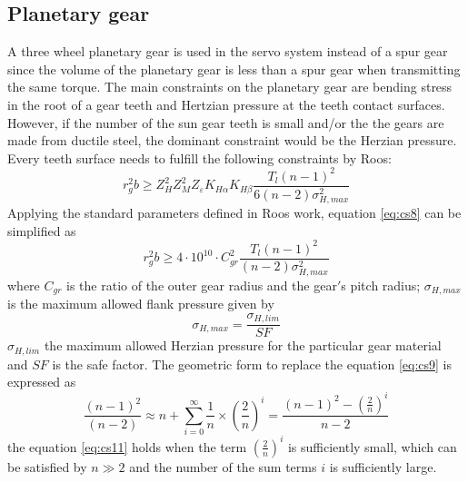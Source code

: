 \subsection*{Planetary gear}
A three wheel planetary gear is used in the servo system instead of a spur gear since the volume of the planetary gear is less than a spur gear when transmitting the same torque. The main constraints on the planetary gear are bending stress in the root of a gear teeth and Hertzian pressure at the teeth contact surfaces. However, if the number of the sun gear teeth is small and/or the the gears are made from ductile steel, the dominant constraint would be the Herzian pressure. Every teeth surface needs to fulfill the following constraints by Roos:
\begin{equation} \label{eq:cs8}
r_g^2b \geqslant Z_H^2Z_M^2Z_{\varepsilon}K_{H\alpha}K_{H\beta}\frac{T_l(n-1)^2}{6(n-2)\sigma_{H,max}^2}
\end{equation}
Applying the standard parameters defined in Roos work, equation \ref{eq:cs8} can be simplified as
\begin{equation} \label{eq:cs9}
r_g^2b \geqslant 4\cdot10^{10} \cdot C_{gr}^2\frac{T_l(n-1)^2}{(n-2)\sigma_{H,max}^2}
\end{equation}
where $C_{gr}$ is the ratio of the outer gear radius and the gear$'$s pitch radius; $\sigma_{H,max}$ is the maximum allowed flank pressure given by
\begin{equation} \label{eq:cs10}
\sigma_{H,max}=\frac{\sigma_{H,lim}}{SF}
\end{equation}
$\sigma_{H,lim}$ the maximum allowed Herzian pressure for the particular gear material and $SF$ is the safe factor.
The geometric form to replace the equation \ref{eq:cs9} is expressed as
\begin{equation} \label{eq:cs11}
\frac{(n-1)^2}{(n-2)} \approx n+\sum_{i=0}^{\infty} \frac{1}{n}\times(\frac{2}{n})^i = \frac{(n-1)^2-(\frac{2}{n})^i}{n-2}
\end{equation}
the equation \ref{eq:cs11} holds when the term $(\frac{2}{n})^i$ is sufficiently small, which can be satisfied by $n \gg 2$ and the number of the sum terms $i$ is sufficiently large. 
